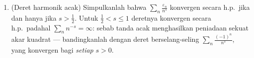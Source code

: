 \begin{problem}
\begin{enumerate}[resume]
        (a) Buktikanlah \emph{ketaksamaan Paley--Zygmund}: bahwa bagi
        $Z \geq 0$ dengan $\E Z^2 < \infty$ dan $0 < \theta <
        1$,
        \[
        \P\bigl(Z > \theta\,\E Z\bigr) \;\geq\; (1 -
        \theta)^2\,\frac{(\E Z)^2}{\E Z^2}
        \]
        \emph{(belahlah $\E Z$ pada aras $\theta\E Z$ lalu
        terapkanlah Cauchy--Schwarz pada keping atasnya)}.
        (b) Tunjukkanlah $\E T_n^4 \leq 3s_n^4$.
        (c) Simpulkanlah $\P\bigl(\abs{T_n} > \frac{s_n}2\bigr)
        \geq \frac3{16}$ lalu simpulkanlah bahwa
        $\sum_nx_n\varepsilon_n$ divergen secara h.p.; sehingga
        dikotominya
        \[
        \sum_nx_n\varepsilon_n\ \text{konvergen h.p.}
        \iff \sum_nx_n^2 < \infty .
        \]
  \item (Deret harmonik acak) Simpulkanlah bahwa
        $\sum_n\frac{\varepsilon_n}{n^s}$ konvergen secara h.p.\
        jika dan hanya jika $s > \frac12$. Untuk $\frac12 < s \leq
        1$ deretnya konvergen secara h.p.\ padahal
        $\sum_nn^{-s} = \infty$: sebab tanda acak menghasilkan
        peniadaan sekuat akar kuadrat --- bandingkanlah dengan
        deret berselang-seling $\sum_n\frac{(-1)^n}{n^s}$,
        yang konvergen bagi \emph{setiap} $s > 0$.
\end{enumerate}


\end{problem}
